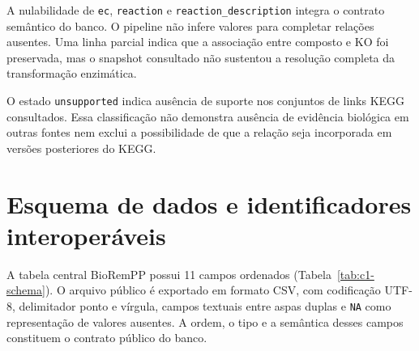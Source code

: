 A nulabilidade de \texttt{ec}, \texttt{reaction} e
\texttt{reaction\_description} integra o contrato semântico do banco. O
pipeline não infere valores para completar relações ausentes. Uma linha
parcial indica que a associação entre composto e KO foi preservada, mas o
snapshot consultado não sustentou a resolução completa da transformação
enzimática.

O estado \texttt{unsupported} indica ausência de suporte nos conjuntos de
links KEGG consultados. Essa classificação não demonstra ausência de evidência
biológica em outras fontes nem exclui a possibilidade de que a relação seja
incorporada em versões posteriores do KEGG.

\section{Esquema de dados e identificadores interoperáveis}
\label{sec:c1-schema}

A tabela central BioRemPP possui 11 campos ordenados
(Tabela~\ref{tab:c1-schema}). O arquivo público é exportado em formato CSV,
com codificação UTF-8, delimitador ponto e vírgula, campos textuais entre
aspas duplas e \texttt{NA} como representação de valores ausentes. A ordem,
o tipo e a semântica desses campos constituem o contrato público do banco.

